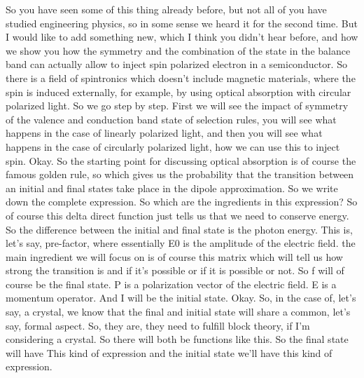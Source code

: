 So you have seen some of this thing already before, but not all of you have studied engineering physics, so in some sense we heard it for the second time. But I would like to add something new, which I think you didn't hear before, and how we show you how the symmetry and the combination of the state in the balance band can actually allow to inject spin polarized electron in a semiconductor. So there is a field of spintronics which doesn't include magnetic materials, where the spin is induced externally, for example, by using optical absorption with circular polarized light. So we go step by step. First we will see the impact of symmetry of the valence and conduction band state of selection rules, you will see what happens in the case of linearly polarized light, and then you will see what happens in the case of circularly polarized light, how we can use this to inject spin. Okay. So the starting point for discussing optical absorption is of course the famous golden rule, so which gives us the probability that the transition between an initial and final states take place in the dipole approximation. So we write down the complete expression. So which are the ingredients in this expression? So of course this delta direct function just tells us that we need to conserve energy. So the difference between the initial and final state is the photon energy. This is, let's say, pre-factor, where essentially E0 is the amplitude of the electric field. the main ingredient we will focus on is of course this matrix which will tell us how strong the transition is and if it's possible or if it is possible or not. So f will of course be the final state. P is a polarization vector of the electric field. E is a momentum operator. And I will be the initial state. Okay. So, in the case of, let's say, a crystal, we know that the final and initial state will share a common, let's say, formal aspect. So, they are, they need to fulfill block theory, if I'm considering a crystal. So there will both be functions like this. So the final state will have This kind of expression and the initial state we'll have this kind of expression.
